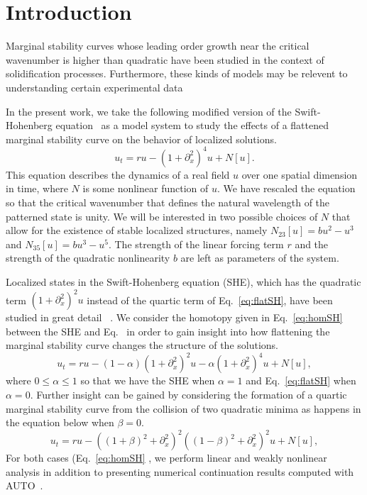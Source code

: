 \documentclass[../main/FlatMarginalStability.tex]{subfiles}
\begin{document}
\section{Introduction}

Marginal stability curves whose leading order growth near the critical wavenumber is higher than quadratic have been studied in the context of solidification processes\cite{proctor1991instabilities,riley1989eckhaus}.  Furthermore, these kinds of models may be relevent to understanding certain experimental data~\cite{}

In the present work, we take the following modified version of the Swift-Hohenberg equation~\cite{} as a model system to study the effects of a flattened marginal stability curve on the behavior of localized solutions.
\begin{equation}
u_t= r u-\left(1+\partial_{x}^2\right)^4 u+N[u]\label{eq:flatSH}.
\end{equation}
This equation describes the dynamics of a real field $u$ over one spatial dimension in time, where $N$ is some nonlinear function of $u$.  We have rescaled the equation so that the critical wavenumber that defines the natural wavelength of the patterned state is unity.  We will be interested in two possible choices of $N$ that allow for the existence of stable localized structures, namely $N_{23}[u]=bu^2-u^3$ and $N_{35}[u]=b u^3-u^5$.  The strength of the linear forcing term $r$ and the strength of the quadratic nonlinearity $b$ are left as parameters of the system.  

Localized states in the Swift-Hohenberg equation (SHE), which has the quadratic term $\left(1+\partial_{x}^2\right)^2u$ instead of the quartic term of Eq.~\ref{eq:flatSH}, have been studied in great detail  ~\cite{}. We consider the homotopy given in Eq.~\ref{eq:homSH} between the SHE and Eq.~\cite{eq:flatSH} in order to gain insight into how flattening the marginal stability curve changes the structure of the solutions.
\begin{equation}
u_t= r u-(1-\alpha)\left(1+\partial_{x}^2\right)^2 u-\alpha\left(1+\partial_{x}^2\right)^4 u+N[u]\label{eq:homSH},
\end{equation}
where $0\le \alpha \le 1$ so that we have the SHE when $\alpha=1$ and Eq.~\ref{eq:flatSH} when $\alpha=0$.  
Further insight can be gained by considering the formation of a quartic marginal stability curve from the collision of two quadratic minima as happens in the equation below when $\beta=0$.
\begin{equation}
u_t= r u-\left((1+\beta)^2+\partial_{x}^2\right)^2 \left((1-\beta)^2+\partial_{x}^2\right)^2 u+N[u]\label{eq:collSH},
\end{equation}
For both cases (Eq.~\ref{eq:homSH} , we perform linear and weakly nonlinear analysis in addition to presenting numerical continuation results computed with AUTO~\cite{}.     
\end{document}
